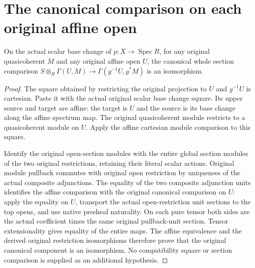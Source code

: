\section{The canonical comparison on each original affine open}

\begin{lemma}\label{lem:fc-module-flat-base-change-affine-open}
\leanok
{}
On the actual scalar base change of $p:X\to\operatorname{Spec}R$,
for any original quasicoherent $M$ and any original affine open $U$,
the canonical whole section comparison
$S\otimes_R\Gamma(U,M)\to\Gamma(g^{-1}U,g^*M)$ is an isomorphism.
\end{lemma}
\begin{proof}
The square obtained by restricting the original projection to $U$ and
$g^{-1}U$ is cartesian. Paste it with the actual original scalar base
change square. Its upper source and target are affine: the target is
$U$ and the source is its base change along the affine spectrum map.
The original quasicoherent module restricts to a quasicoherent module
on $U$. Apply the affine cartesian module comparison to this square.

Identify the original open-section modules with the entire global
section modules of the two original restrictions, retaining their
literal scalar actions. Original module pullback commutes with original
open restriction by uniqueness of the actual composite adjunctions.
The equality of the two composite adjunction units identifies the
affine comparison with the original canonical comparison on $U$:
apply the equality on $U$, transport the actual open-restriction unit
sections to the top opens, and use native presheaf naturality. On each
pure tensor both sides are the actual coefficient times the same
original pullback-unit section. Tensor extensionality gives equality
of the entire maps. The affine equivalence and the derived original
restriction isomorphisms therefore prove that the original canonical
component is an isomorphism. No compatibility square or section
comparison is supplied as an additional hypothesis.
\end{proof}
